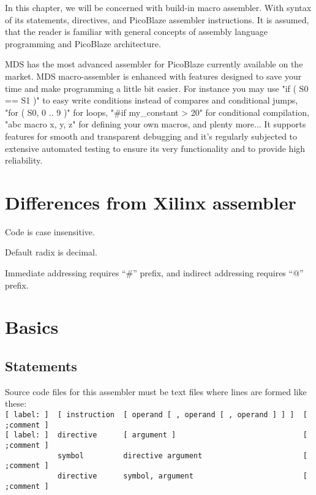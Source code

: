 In this chapter, we will be concerned with build-in macro assembler. With syntax of its statements, directives, and PicoBlaze assembler instructions. It is assumed, that the reader is familiar with general concepts of assembly language programming and PicoBlaze architecture.

MDS has the most advanced assembler for PicoBlaze currently available on the market. MDS macro-assembler is enhanced with features designed to save your time and make programming a little bit easier. For instance you may use "if ( S0 == S1 )" to easy write conditions instead of compares and conditional jumps, "for ( S0, 0 .. 9 )" for loops, "#if my_constant > 20" for conditional compilation, "abc macro x, y, z" for defining your own macros, and plenty more... It supports features for smooth and transparent debugging and it's regularly subjected to extensive automated testing to ensure its very functionality and to provide high reliability.

\section{Differences from Xilinx assembler}
    \begin{enumeration}
        \item Code is case insensitive.
        \item Default radix is decimal.
        \item Immediate addressing requires ``#'' prefix, and indirect addressing requires ``@'' prefix.
    \end{enumeration}

\section{Basics}
    \subsection{Statements}
        Source code files for this assembler must be text files where lines are formed like these:\\
        {
            \usecodefont
            \verb'[ label: ]  [ instruction  [ operand [ , operand [ , operand ] ] ]  [ ;comment ]'\\
            \verb'[ label: ]  directive      [ argument ]                             [ ;comment ]'\\
            \verb'            symbol         directive argument                       [ ;comment ]'\\
            \verb'            directive      symbol, argument                         [ ;comment ]'
        }

